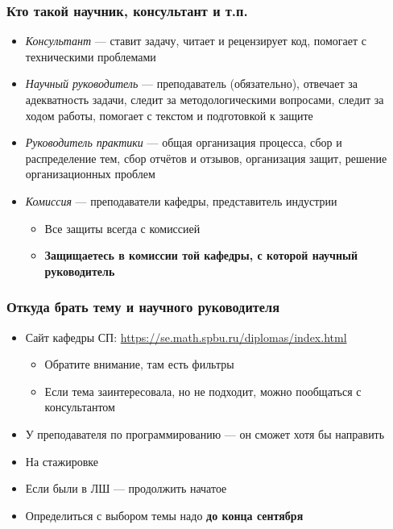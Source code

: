 \documentclass{../../slides-style}
\begin{document}
    \begin{frame}
        \frametitle{Кто такой научник, консультант и т.п.}
        \begin{itemize}
            \item \textit{Консультант} --- ставит задачу, читает и рецензирует код, помогает с техническими проблемами
            \item \textit{Научный руководитель} --- преподаватель (обязательно), отвечает за адекватность задачи, следит за методологическими вопросами, следит за ходом работы, помогает с текстом и подготовкой к защите
            \item \textit{Руководитель практики} --- общая организация процесса, сбор и распределение тем, сбор отчётов и отзывов, организация защит, решение организационных проблем
            \item \textit{Комиссия} --- преподаватели кафедры, представитель индустрии
            \begin{itemize}
                \item Все защиты всегда с комиссией
                \item \textbf{Защищаетесь в комиссии той кафедры, с которой научный руководитель}
            \end{itemize}
        \end{itemize}
    \end{frame}

    \begin{frame}
        \frametitle{Откуда брать тему и научного руководителя}
        \begin{itemize}
            \item Сайт кафедры СП: \url{https://se.math.spbu.ru/diplomas/index.html}
            \begin{itemize}
                \item Обратите внимание, там есть фильтры
                \item Если тема заинтересовала, но не подходит, можно пообщаться с консультантом
            \end{itemize}
            \item У преподавателя по программированию --- он сможет хотя бы направить
            \item На стажировке
            \item Если были в ЛШ --- продолжить начатое
            \item Определиться с выбором темы надо \textbf{до конца сентября}
        \end{itemize}
    \end{frame}
\end{document}
